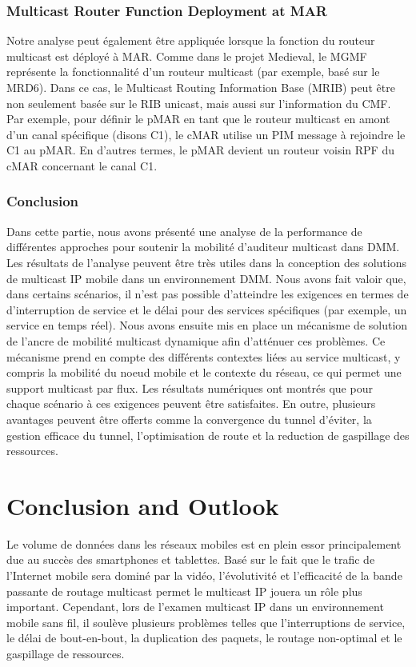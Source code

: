 \subsubsection{Multicast Router Function Deployment at MAR}
Notre analyse peut également être appliquée lorsque la fonction du routeur multicast est déployé à MAR. Comme dans le projet Medieval, le MGMF représente la fonctionnalité d'un routeur multicast (par exemple, basé sur le MRD6). Dans ce cas, le Multicast Routing Information Base (MRIB) peut être non seulement basée sur le RIB unicast, mais aussi sur l'information du CMF. Par exemple, pour définir le pMAR en tant que le routeur multicast en amont d'un canal spécifique (disons C1), le cMAR utilise un PIM message à rejoindre le C1 au pMAR. En d'autres termes, le pMAR devient un routeur voisin RPF du cMAR concernant le canal C1.


\subsubsection{Conclusion}\label{c10:conclusion}
Dans cette partie, nous avons présenté une analyse de la performance de différentes approches pour soutenir la mobilité d'auditeur multicast dans DMM. Les résultats de l'analyse peuvent être très utiles dans la conception des solutions de multicast IP mobile dans un environnement DMM. Nous avons fait valoir que, dans certains scénarios, il n'est pas possible d'atteindre les exigences en termes de d'interruption de service et le délai pour des services spécifiques (par exemple, un service en temps réel). Nous avons ensuite mis en place un mécanisme de solution de l'ancre de mobilité multicast dynamique afin d'atténuer ces problèmes. Ce mécanisme prend en compte des différents contextes liées au service multicast, y compris la mobilité du noeud mobile et le contexte du réseau, ce qui permet une support multicast par flux. Les résultats numériques ont montrés que pour chaque scénario à ces exigences peuvent être satisfaites. En outre, plusieurs avantages peuvent être offerts comme la convergence du tunnel d'éviter, la gestion efficace du tunnel, l'optimisation de route et la reduction de gaspillage des ressources.


\section{Conclusion and Outlook}
Le volume de données dans les réseaux mobiles est en plein essor principalement due au succès des smartphones et tablettes. Basé sur le fait que le trafic de l'Internet mobile sera dominé par la vidéo, l'évolutivité et l'efficacité de la bande passante de routage multicast permet le multicast IP jouera un rôle plus important. Cependant, lors de l'examen multicast IP dans un environnement mobile sans fil, il soulève plusieurs problèmes telles que l'interruptions de service, le délai de bout-en-bout, la duplication des paquets, le routage non-optimal et le gaspillage de ressources.


